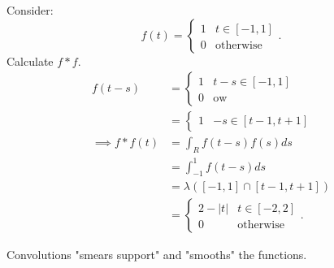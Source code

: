 \begin{eg}
	Consider:
	 \[
		 f\left( t \right)  = \begin{cases}
			 1 & t \in  \left[ -1, 1 \right]  \\
			 0 & \text{otherwise}
		 \end{cases}
	.\] 
	Calculate $f * f$. 
	\begin{align*}
		f \left( t - s \right) &= \begin{cases}
			1 & t - s \in \left[ -1, 1 \right] \\
			0 & \text{ow}
		\end{cases} \\
		&= \begin{cases}
			1 & -s \in \left[ t -1 , t + 1 \right] 
		\end{cases} \\
			\implies f * f\left( t \right) &= \int_{R}^{ } f \left( t - s \right) f \left( s \right) d s  \\
						       &= \int_{-1}^{1} f \left( t - s \right) d s   \\
						       &= \lambda\left( \left[ -1, 1 \right] \cap \left[ t - 1, t + 1 \right]  \right)  \\
						       &= \begin{cases}
							       2 - \left| t \right|  & t \in  \left[ -2, 2 \right] \\
							       0 & \text{otherwise}
						       \end{cases}
	.\end{align*}
	\begin{punch}
		Convolutions "smears support" and "smooths" the functions. 
	\end{punch}
\end{eg}
